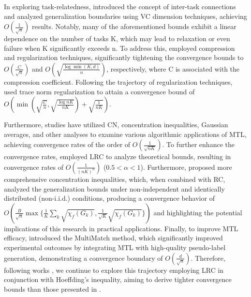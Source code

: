\documentclass{article}
\begin{document}
In exploring task-relatedness, \cite{ben08} introduced the concept of inter-task connections and analyzed generalization boundaries using VC dimension techniques, achieving $O(\frac{1}{\sqrt{n}})$ results. Notably, many of the aforementioned bounds exhibit a linear dependence on the number of tasks K, which may lead to relaxation or even failure when K significantly exceeds n. To address this, \cite{juba06,kakade12} employed compression and regularization techniques, significantly tightening the convergence bounds to $O(\frac{C}{\sqrt{n}})$ and $O(\sqrt{\frac{\log \min(K,d)}{n}})$, respectively, where C is associated with the compression coefficient. Following the trajectory of regularization techniques, \cite{pontil2013excess} used trace norm regularization to attain a convergence bound of $O(\min(\sqrt{\frac{C}{n}}, \sqrt{\frac{\log nK}{nK}}) + \sqrt{\frac{1}{nK}})$.

Furthermore, studies \cite{pentina2015multi,zhang15multi,maurer2016benefit} have utilized CN, concentration inequalities, Gaussian averages, and other analyses to examine various algorithmic applications of MTL, achieving convergence rates of the order of $O(\frac{1}{\sqrt{n K}})$. To further enhance the convergence rates, \cite{yousefi18,watkins2023optimistic} employed LRC \cite{Bartlett_2005} to analyze theoretical bounds, resulting in convergence rates of $O(\frac{1}{(n K)^{\alpha}})$ ($0.5 < \alpha < 1$). Furthermore, \cite{wu2023macro-auc} proposed more comprehensive concentration inequalities, which, when combined with RC, analyzed the generalization bounds under non-independent and identically distributed (non-i.i.d.) conditions, producing a convergence behavior of $O(\frac{B}{\sqrt{n}} \max\{ \frac{1}{K} \sum_k \sqrt{\chi_f(G_k)}, \frac{1}{\sqrt{K}} \sqrt{\chi_f(G_k)} \})$ and highlighting the potential implications of this research in practical applications. Finally, to improve MTL efficacy, \cite{qi2024multimatch} introduced the MultiMatch method, which significantly improved experimental outcomes by integrating MTL with high-quality pseudo-label generation, demonstrating a convergence boundary of $O(\frac{d}{\sqrt{n}})$. Therefore, following works \cite{yousefi18,watkins2023optimistic,wu2023macro-auc}, we continue to explore this trajectory employing LRC in conjunction with Hoeffding's inequality, aiming to derive tighter convergence bounds than those presented in \cite{wu2023macro-auc}.
\end{document}
